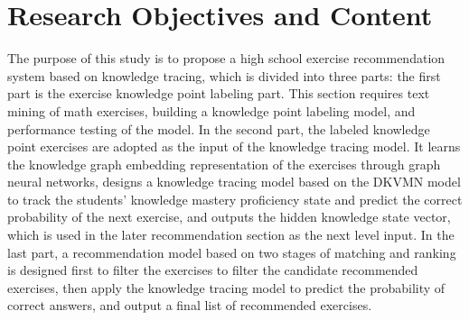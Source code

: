 \section{Research Objectives and Content}  %

The purpose of this study is to propose a high school exercise recommendation system based on knowledge tracing, which is divided into three parts: the first part is the exercise knowledge point labeling part. This section requires text mining of math exercises, building a knowledge point labeling model, and performance testing of the model. In the second part, the labeled knowledge point exercises are adopted as the input of the knowledge tracing model. It learns the knowledge graph embedding representation of the exercises through graph neural networks, designs a knowledge tracing model based on the DKVMN model to track the students' knowledge mastery proficiency state and predict the correct probability of the next exercise, and outputs the hidden knowledge state vector, which is used in the later recommendation section as the next level input. In the last part, a recommendation model based on two stages of matching and ranking is designed first to filter the exercises to filter the candidate recommended exercises, then apply the knowledge tracing model to predict the probability of correct answers, and output a final list of recommended exercises.

